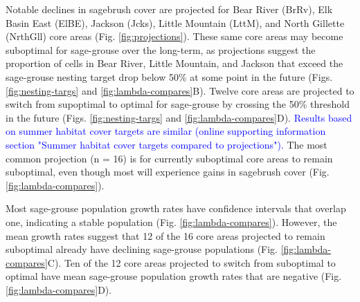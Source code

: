 \documentclass[
  12pt,
]{article}
\begin{document}
Notable declines in sagebrush cover are projected for Bear River (BrRv), Elk Basin East (ElBE), Jackson (Jcks), Little Mountain (LttM), and North Gillette (NrthGll) core areas (Fig. \ref{fig:projections}).
These same core areas may become suboptimal for sage-grouse over the long-term, as projections suggest the proportion of cells in Bear River, Little Mountain, and Jackson that exceed the sage-grouse nesting target drop below 50\% at some point in the future (Figs. \ref{fig:nesting-targs} and \ref{fig:lambda-compares}B).
Twelve core areas are projected to switch from supoptimal to optimal for sage-grouse by crossing the 50\% threshold in the future (Figs. \ref{fig:nesting-targs} and \ref{fig:lambda-compares}D).
\textcolor{blue}{Results based on summer habitat cover targets are similar (online supporting information section "Summer habitat cover targets compared to projections").}
The most common projection (n = 16) is for currently suboptimal core areas to remain suboptimal, even though most will experience gains in sagebrush cover (Fig. \ref{fig:lambda-compares}).

Most sage-grouse population growth rates have confidence intervals that overlap one, indicating a stable population (Fig. \ref{fig:lambda-compares}).
However, the mean growth rates suggest that 12 of the 16 core areas projected to remain suboptimal already have declining sage-grouse populations (Fig. \ref{fig:lambda-compares}C).
Ten of the 12 core areas projected to switch from suboptimal to optimal have mean sage-grouse population growth rates that are negative (Fig. \ref{fig:lambda-compares}D).
\end{document}
